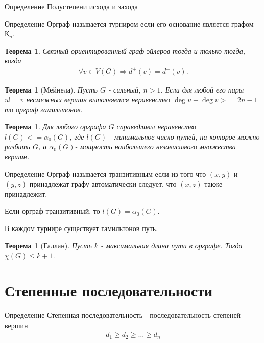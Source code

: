 \documentclass[a4paper,openany]{book}
\newcounter{TheoremCounter}
\newtheorem{theorem}[TheoremCounter]{Теорема}
\newenvironment{definition}
{\begin{statement}{Определение}}
    {\end{statement}}
\begin{document}
\begin{definition}
  Полустепени исхода и захода
\end{definition}

\begin{definition}
  Орграф называется турниром если его основание является графом $К_n$.
\end{definition}

\begin{theorem}
  Связный ориентированный граф эйлеров тогда и только тогда, когда
  \begin{align*}
    \forall v \in V(G) \Rightarrow d^+(v) = d^-(v).
  \end{align*}
\end{theorem}

\begin{theorem}[Мейнела]
  Пусть $G$ - сильный, $n > 1$. Если для любой его пары $u != v$ несмежных
  вершин выполняется неравенство $\deg u + \deg v >= 2n - 1$ то орграф гамильтонов.
\end{theorem}

\begin{theorem}
  Для любого орграфа $G$ справедливы неравенство $l(G)<= \alpha_0(G)$, где
  $l(G)$ - минимальное число путей, на которое можно разбить $G$, а
  $\alpha_0(G)$- мощность наибольшего независимого множества вершин.
\end{theorem}

\begin{definition}
  Орграф называется транзитивным если из того что $(x,y)$ и $(y, z)$ принадлежат
  графу автоматически следует, что $(x,z)$ также принадлежит.
\end{definition}

\begin{consequences}
  \item Если орграф транзитивный, то $l(G) = \alpha_0(G)$.
  \item В каждом турнире существует гамильтонов путь.
\end{consequences}

\begin{theorem}[Галлан]
  Пусть $k$ - максимальная длина пути в орграфе. Тогда $\chi(G) \leqslant k+1$.
\end{theorem}

\chapter{Степенные последовательности}
\begin{definition}
  Степенная последовательность - последовательность степеней вершин
  \begin{align*}
    d_1 \geqslant d_2 \geqslant \ldots \geqslant d_n
  \end{align*}
\end{definition}
\end{document}
